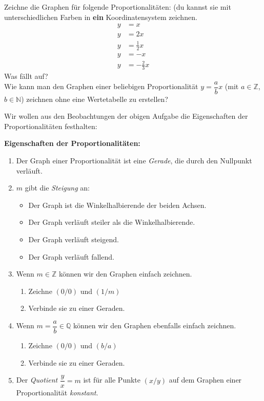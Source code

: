 \documentclass[11pt,oneside]{article}
\begin{document}
	\begin{aufgabe}
		Zeichne die Graphen für folgende Proportionalitäten: (du kannst sie mit unterschiedlichen Farben in \textbf{ein} Koordinatensystem zeichnen.
		\begin{align*}
			y&=x\\
			y&=2x\\
			y&=\frac{1}{2}x\\
			y&=-x\\
			y&=-\frac{2}{3}x
		\end{align*}
		Was fällt auf?\\
		Wie kann man den Graphen einer beliebigen Proportionalität $y=\dfrac{a}{b}x$ (mit $a\in \mathbb{Z}$, $b \in \mathbb{N}$) zeichnen ohne eine Wertetabelle zu erstellen?
	\end{aufgabe}
	Wir wollen aus den Beobachtungen der obigen Aufgabe die Eigenschaften der Proportionalitäten festhalten:
	\begin{framed}\noindent\textbf{Eigenschaften der Proportionalitäten:}
		\begin{enumerate}[label=\roman*)]
			\item Der Graph einer Proportionalität ist eine \emph{Gerade}, die durch den Nullpunkt verläuft.
			\item $m$ gibt die \emph{Steigung} an:
			\begin{itemize}\item[$m=1:$] Der Graph ist die Winkelhalbierende der beiden Achsen.
				\item[$m>1:$] Der Graph verläuft steiler als die Winkelhalbierende.
				\item[$m>0:$] Der Graph verläuft steigend.
				\item[$m<0:$] Der Graph verläuft fallend.
			\end{itemize}
			\item Wenn $m\in\mathbb{Z}$ können wir den Graphen einfach zeichnen.
			\begin{enumerate}[label=\alph*)]
				\item Zeichne $(0/0)$ und $(1/m)$
				\item Verbinde sie zu einer Geraden.
			\end{enumerate}
			\item Wenn $m=\dfrac{a}{b}\in\mathbb{Q}$ können wir den Graphen ebenfalls einfach zeichnen.
			\begin{enumerate}[label=\alph*)]
				\item Zeichne $(0/0)$ und $(b/a)$
				\item Verbinde sie zu einer Geraden.
			\end{enumerate}
			\item Der \emph{Quotient} $\dfrac{y}{x}=m$ ist für alle Punkte $(x/y)$ auf dem Graphen einer Proportionalität \emph{konstant}.
		\end{enumerate}
	\end{framed}
\end{document}
